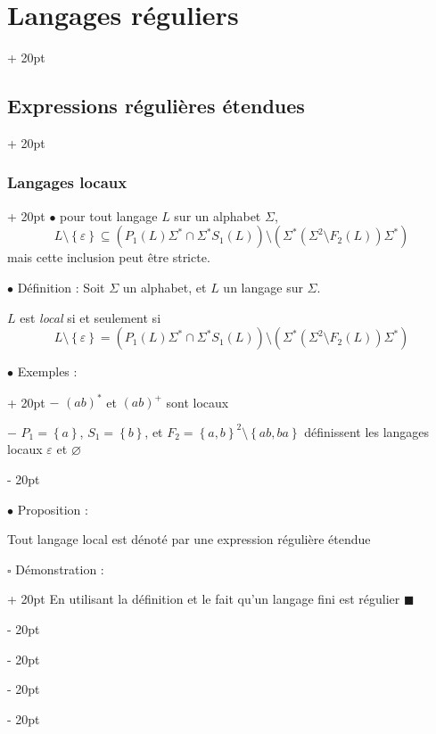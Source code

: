 \documentclass[a4paper, 12pt, twoside]{article}
\newcommand{\lr}[1]{\left( #1 \right)}
\newcommand{\set}[1]{\left\{ #1 \right\}}
\newcommand{\ind}[1][20pt]{\advance\leftskip + #1}
\newcommand{\deind}[1][20pt]{\advance\leftskip - #1}
\newenvironment{indt}[2][20pt]{#2 \par \ind[#1]}{\par \deind} %
\newenvironment{proof}[1][{Démonstration :}]{\begin{indt}{$\square$ #1}}{$\blacksquare$ \end{indt}}
\begin{document}
\begin{indt}{\section{Langages réguliers}}
\begin{indt}{\subsection{Expressions régulières étendues}}
            \vspace{12pt}
            
            \begin{indt}{\subsubsection{Langages locaux}}
                $\bullet$  pour tout langage $L$ sur un alphabet $\Sigma$,
                \[
                    L \setminus \set \varepsilon
                    \subseteq
                    \lr{P_1(L) \Sigma^* \cap \Sigma^* S_1(L)} \setminus \lr{\Sigma^*\lr{\Sigma^2 \setminus F_2(L)} \Sigma^*}
                \]
                mais cette inclusion peut être stricte.

                \vspace{12pt}
                
                $\bullet$ Définition : Soit $\Sigma$ un alphabet, et $L$ un langage sur $\Sigma$.

                $L$ est \emph{local} si et seulement si
                \[
                    L \setminus \set \varepsilon = \lr{P_1(L) \Sigma^* \cap \Sigma^* S_1(L)} \setminus \lr{\Sigma^*\lr{\Sigma^2 \setminus F_2(L)} \Sigma^*}
                \]

                \vspace{12pt}
                
                \begin{indt}{$\bullet$ Exemples :}
                    $-$ $(ab)^*$ et $(ab)^+$ sont locaux

                    $-$ $P_1 = \set a$, $S_1 = \set b$, et $F_2 = \set{a, b}^2 \setminus \set{ab, ba}$ définissent les langages locaux $\varepsilon$ et $\varnothing$
                \end{indt}

                \vspace{12pt}
                
                $\bullet$ Proposition :
                \begin{emphBox}
                    Tout langage local est dénoté par une expression régulière étendue
                \end{emphBox}

                \vspace{6pt}
                
                \begin{proof}
                    En utilisant la définition et le fait qu'un langage fini est régulier 
                \end{proof}


\end{indt}
\end{indt}
\end{indt}
\end{document}
